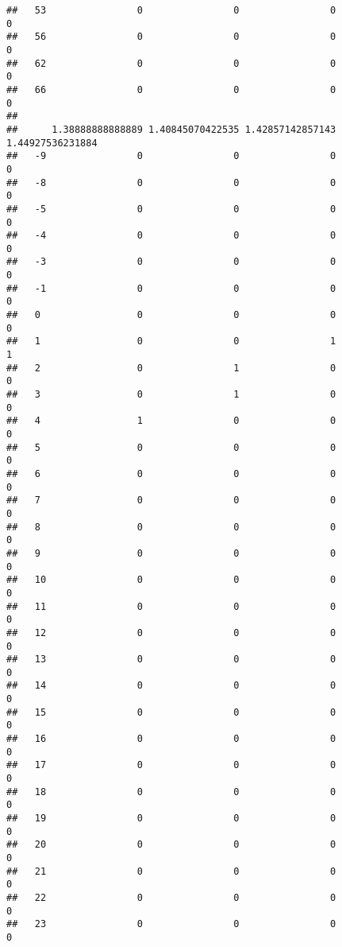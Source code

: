 \documentclass[]{article}
\begin{document}
\begin{verbatim}
##   53                0                0                0                0
##   56                0                0                0                0
##   62                0                0                0                0
##   66                0                0                0                0
##     
##      1.38888888888889 1.40845070422535 1.42857142857143 1.44927536231884
##   -9                0                0                0                0
##   -8                0                0                0                0
##   -5                0                0                0                0
##   -4                0                0                0                0
##   -3                0                0                0                0
##   -1                0                0                0                0
##   0                 0                0                0                0
##   1                 0                0                1                1
##   2                 0                1                0                0
##   3                 0                1                0                0
##   4                 1                0                0                0
##   5                 0                0                0                0
##   6                 0                0                0                0
##   7                 0                0                0                0
##   8                 0                0                0                0
##   9                 0                0                0                0
##   10                0                0                0                0
##   11                0                0                0                0
##   12                0                0                0                0
##   13                0                0                0                0
##   14                0                0                0                0
##   15                0                0                0                0
##   16                0                0                0                0
##   17                0                0                0                0
##   18                0                0                0                0
##   19                0                0                0                0
##   20                0                0                0                0
##   21                0                0                0                0
##   22                0                0                0                0
##   23                0                0                0                0

\end{verbatim}
\end{document}
